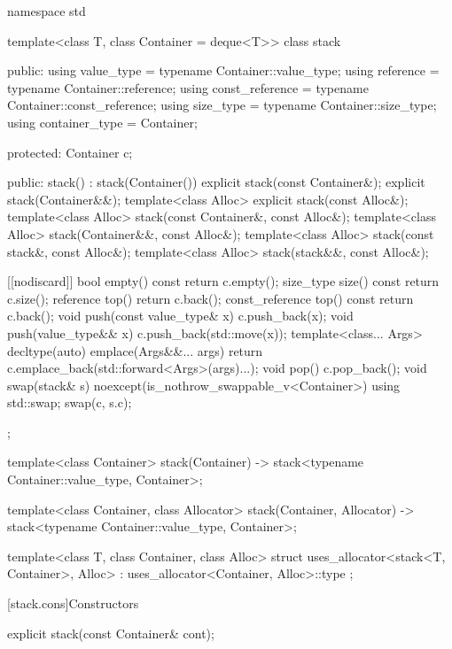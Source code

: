 \begin{codeblock}
namespace std {
  template<class T, class Container = deque<T>>
  class stack {
  public:
    using value_type      = typename Container::value_type;
    using reference       = typename Container::reference;
    using const_reference = typename Container::const_reference;
    using size_type       = typename Container::size_type;
    using container_type  = Container;

  protected:
    Container c;

  public:
    stack() : stack(Container()) {}
    explicit stack(const Container&);
    explicit stack(Container&&);
    template<class Alloc> explicit stack(const Alloc&);
    template<class Alloc> stack(const Container&, const Alloc&);
    template<class Alloc> stack(Container&&, const Alloc&);
    template<class Alloc> stack(const stack&, const Alloc&);
    template<class Alloc> stack(stack&&, const Alloc&);

    [[nodiscard]] bool empty() const    { return c.empty(); }
    size_type size()  const             { return c.size(); }
    reference         top()             { return c.back(); }
    const_reference   top() const       { return c.back(); }
    void push(const value_type& x)      { c.push_back(x); }
    void push(value_type&& x)           { c.push_back(std::move(x)); }
    template<class... Args>
      decltype(auto) emplace(Args&&... args)
        { return c.emplace_back(std::forward<Args>(args)...); }
    void pop()                          { c.pop_back(); }
    void swap(stack& s) noexcept(is_nothrow_swappable_v<Container>)
      { using std::swap; swap(c, s.c); }
  };

  template<class Container>
    stack(Container) -> stack<typename Container::value_type, Container>;

  template<class Container, class Allocator>
    stack(Container, Allocator) -> stack<typename Container::value_type, Container>;

  template<class T, class Container, class Alloc>
    struct uses_allocator<stack<T, Container>, Alloc>
      : uses_allocator<Container, Alloc>::type { };
}
\end{codeblock}

[stack.cons]{Constructors}

%
\begin{itemdecl}
explicit stack(const Container& cont);
\end{itemdecl}

